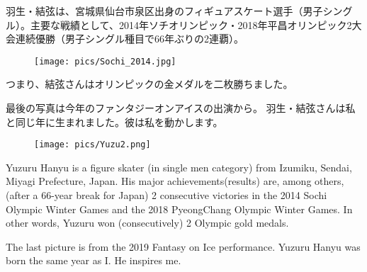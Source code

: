 \documentclass{article}
\begin{document}
\begin{CJK}{UTF8}{min}
羽生・結弦は、宮城県仙台市泉区出身のフィギュアスケート選手（男子シングル）。主要な戦績として、2014年ソチオリンピック・2018年平昌オリンピック2大会連続優勝（男子シングル種目で66年ぶりの2連覇）。
\begin{wrapfigure}{r}{0.45\textwidth} 
    \centering
    \texttt{[image: pics/Sochi\_2014.jpg]}
\end{wrapfigure}
つまり、結弦さんはオリンピックの金メダルを二枚勝ちました。
\newpage
\newline

最後の写真は今年のファンタジーオンアイスの出演から。
羽生・結弦さんは私と同じ年に生まれました。彼は私を動かします。
\end{CJK}
\newline
\begin{wrapfigure}{r}{0.35\textwidth} 
    \centering
    \texttt{[image: pics/Yuzu2.png]}
\end{wrapfigure}
Yuzuru Hanyu is a figure skater (in single men category) from Izumiku, Sendai, Miyagi Prefecture, Japan. His major achievements(results) are, among others, (after a 66-year break for Japan) 2 consecutive victories in the 2014 Sochi Olympic Winter Games and the 2018 PyeongChang Olympic Winter Games. 
\newline
In other words, Yuzuru won (consecutively) 2 Olympic gold medals. \newline

The last picture is from the 2019 Fantasy on Ice performance. Yuzuru Hanyu was born the same year as I. He inspires me.
\end{document}
